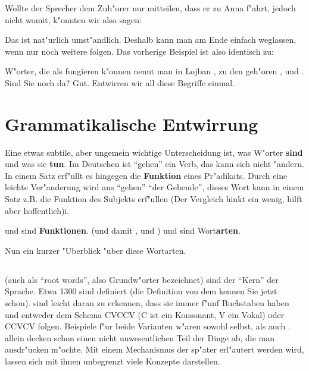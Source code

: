 Wollte der Sprecher dem Zuh"orer nur mitteilen, dass er zu Anna f"ahrt, jedoch nicht womit, k"onnten wir also sagen:
\begin{quote}
\end{quote}
Das ist nat"urlich umst"andlich. Deshalb kann man  am Ende einfach weglassen, wenn nur noch weitere  folgen. Das vorherige Beispiel ist also identisch zu:
\begin{quote}
\end{quote}

W"orter, die als  fungieren k"onnen nennt man in Lojban , zu den  geh"oren ,  und . Sind Sie noch da?
Gut. Entwirren wir all diese Begriffe einmal.

\section{Grammatikalische Entwirrung}
Eine etwas subtile, aber ungemein wichtige Unterscheidung ist, was W"orter \textbf{sind} und was sie \textbf{tun}. Im Deutschen ist ``gehen'' ein Verb, das kann sich nicht "andern.
In einem Satz erf"ullt es hingegen die \textbf{Funktion} eines Pr"adikats. Durch eine leichte Ver"anderung wird aus ``gehen'' ``der Gehende'', dieses Wort kann in einem Satz z.B. die
Funktion des Subjekts erf"ullen (Der Vergleich hinkt ein wenig, hilft aber hoffentlich)i.

 und  sind \textbf{Funktionen}.  (und damit ,  und ) und  sind Wort\textbf{arten}.

Nun ein kurzer "Uberblick "uber diese Wortarten.
\subsection{}
 (auch als ``root words'', also Grundw"orter bezeichnet) sind der ``Kern'' der Sprache. Etwa 1300 sind definiert (die Definition von dem  
kennen Sie jetzt schon).
 sind leicht daran zu erkennen, dass sie immer f"unf Buchstaben haben und entweder dem Schema CVCCV (C ist ein Konsonant, V ein Vokal) oder CCVCV folgen. Beispiele f"ur beide Varianten w"aren sowohl
 selbst, als auch .
 allein decken schon einen nicht unwesentlichen Teil der Dinge ab, die man ausdr"ucken m"ochte. Mit einem Mechanismus der sp"ater erl"autert werden wird, lassen sich mit
ihnen unbegrenzt viele Konzepte darstellen.

